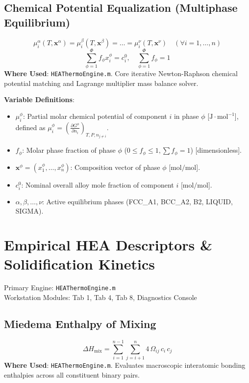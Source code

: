 \documentclass[11pt,a4paper]{article}
\begin{document}
\subsection{Chemical Potential Equalization (Multiphase Equilibrium)}
\begin{equation}
\mu_i^\alpha(T, \mathbf{x}^\alpha) = \mu_i^\beta(T, \mathbf{x}^\beta) = \dots = \mu_i^\nu(T, \mathbf{x}^\nu) \quad (\forall i = 1, \dots, n)
\end{equation}
\begin{equation}
\sum_{\phi=1}^\Phi f_\phi x_i^\phi = c_i^0, \quad \sum_{\phi=1}^\Phi f_\phi = 1
\end{equation}
\textbf{Where Used}: \texttt{HEAThermoEngine.m}. Core iterative Newton-Raphson chemical potential matching and Lagrange multiplier mass balance solver.

\noindent\textbf{Variable Definitions}:
\begin{itemize}
  \item $\mu_i^\phi$: Partial molar chemical potential of component $i$ in phase $\phi$ [$\text{J}\cdot\text{mol}^{-1}$], defined as $\mu_i^\phi = \left(\frac{\partial G^\phi}{\partial n_i}\right)_{T, P, n_{j \ne i}}$.
  \item $f_\phi$: Molar phase fraction of phase $\phi$ ($0 \le f_\phi \le 1, \sum f_\phi = 1$) [dimensionless].
  \item $\mathbf{x}^\phi = (x_1^\phi, \dots, x_n^\phi)$: Composition vector of phase $\phi$ [$\text{mol/mol}$].
  \item $c_i^0$: Nominal overall alloy mole fraction of component $i$ [$\text{mol/mol}$].
  \item $\alpha, \beta, \dots, \nu$: Active equilibrium phases (FCC\_A1, BCC\_A2, B2, LIQUID, SIGMA).
\end{itemize}

\section{Empirical HEA Descriptors \& Solidification Kinetics}
Primary Engine: \texttt{HEAThermoEngine.m} \\
Workstation Modules: Tab 1, Tab 4, Tab 8, Diagnostics Console

\subsection{Miedema Enthalpy of Mixing}
\begin{equation}
\Delta H_{\text{mix}} = \sum_{i=1}^{n-1}\sum_{j=i+1}^n 4 \, \Omega_{ij} \, c_i \, c_j
\end{equation}
\textbf{Where Used}: \texttt{HEAThermoEngine.m}. Evaluates macroscopic interatomic bonding enthalpies across all constituent binary pairs.
\end{document}
